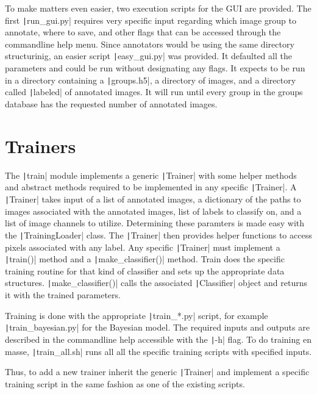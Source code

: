 \documentclass[twoside]{report}
\newcommand{\code}[1]{\texttt|#1|}
\begin{document}
To make matters even easier, two execution scripts for the GUI are provided. The first \code{run_gui.py} requires very specific input regarding which image group to annotate, where to save, and other flags that can be accessed through the commandline help menu. Since annotators would be using the same directory structurinig, an easier script \code{easy_gui.py} was provided. It defaulted all the parameters and could be run without designating any flags. It expects to be run in a directory containing a \code{groups.h5}, a directory of images, and a directory called \code{labeled} of annotated images. It will run until every group in the groups database has the requested number of annotated images. 

\section{Trainers}
The \code{train} module implements a generic \code{Trainer} with some helper methods and abstract methods required to be implemented in any specific \code{Trainer}. A \code{Trainer} takes input of a list of annotated images, a dictionary of the paths to images associated with the annotated images, list of labels to classify on, and a list of image channels to utilize. Determining these paramters is made easy with the \code{TrainingLoader} class. The \code{Trainer} then provides helper functions to access pixels associated with any label. Any specific \code{Trainer} must implement a \code{train()} method and a \code{make_classifier()} method. Train does the specific training routine for that kind of classifier and sets up the appropriate data structures. \code{make_classifier()} calls the associated \code{Classifier} object and returns it with the trained parameters. 

Training is done with the appropriate \code{train_*.py} script, for example \code{train_bayesian.py} for the Bayesian model. The required inputs and outputs are described in the commandline help accessible with the \code{-h} flag. To do training en masse, \code{train_all.sh} runs all all the specific training scripts with specified inputs. 

Thus, to add a new trainer inherit the generic \code{Trainer} and implement a specific training script in the same fashion as one of the existing scripts. 
\end{document}
